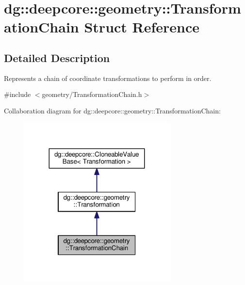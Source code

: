 \hypertarget{structdg_1_1deepcore_1_1geometry_1_1_transformation_chain}{}\section{dg\+:\+:deepcore\+:\+:geometry\+:\+:Transformation\+Chain Struct Reference}
\label{structdg_1_1deepcore_1_1geometry_1_1_transformation_chain}


\subsection{Detailed Description}
Represents a chain of coordinate transformations to perform in order. 

{\ttfamily \#include $<$geometry/\+Transformation\+Chain.\+h$>$}



Collaboration diagram for dg\+:\+:deepcore\+:\+:geometry\+:\+:Transformation\+Chain\+:
\nopagebreak
\begin{figure}[H]
\begin{center}
\leavevmode
\includegraphics[width=227pt]{structdg_1_1deepcore_1_1geometry_1_1_transformation_chain__coll__graph}
\end{center}
\end{figure}
